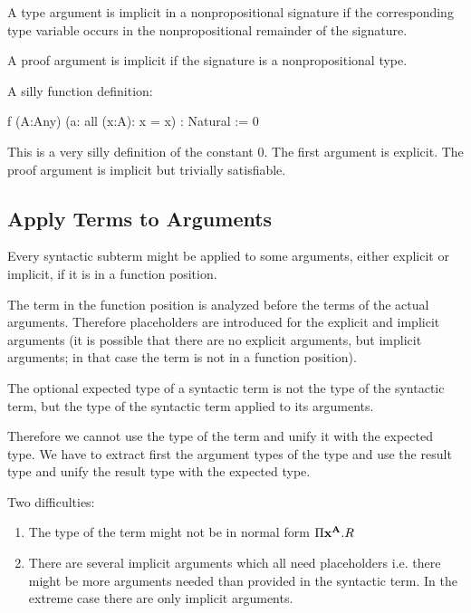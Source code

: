 A type argument is implicit in a nonpropositional signature if the
corresponding type variable occurs in the nonpropositional remainder of the
signature.

A proof argument is implicit if the signature is a nonpropositional type.



A silly function definition:
%
\begin{alba}
  f (A:Any) (a: all (x:A): x = x) : Natural := 0
\end{alba}
%
This is a very silly definition of the constant $0$. The first argument is
explicit. The proof argument is implicit but trivially satisfiable.




\subsection{Apply Terms to Arguments}

Every syntactic subterm might be applied to some arguments, either explicit or
implicit, if it is in a function position.

The term in the function position is analyzed before the terms of the actual
arguments. Therefore placeholders are introduced for the explicit and implicit
arguments (it is possible that there are no explicit arguments, but implicit
arguments; in that case the term is not in a function position).

The optional expected type of a syntactic term is not the type of the
syntactic term, but the type of the syntactic term applied to its arguments.

Therefore we cannot use the type of the term and unify it with the expected
type. We have to extract first the argument types of the type and use the
result type and unify the result type with the expected type.

Two difficulties:

\begin{enumerate}

\item The type of the term might not be in normal form $\Pi \mathbf{x}^{\mathbf{A}} . R$

\item There are several implicit arguments which all need placeholders
  i.e. there might be more arguments needed than provided in the syntactic
  term. In the extreme case there are only implicit arguments.

\end{enumerate}

